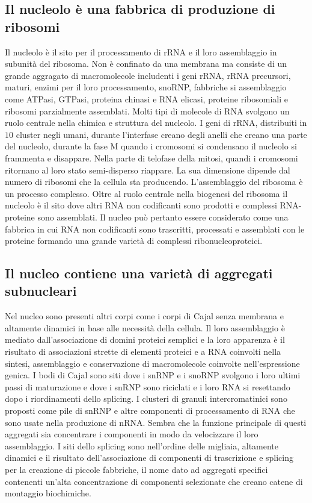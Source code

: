 \subsection{Il nucleolo \`e una fabbrica di produzione di ribosomi}
Il nucleolo \`e il sito per il processamento di rRNA e il loro assemblaggio in subunit\`a del ribosoma. Non \`e confinato da una membrana ma consiste di un grande aggragato di 
macromolecole includenti i geni rRNA, rRNA precursori, maturi, enzimi per il loro processamento, snoRNP, fabbriche si assemblaggio come ATPasi, GTPasi, proteina chinasi e RNA elicasi, 
proteine ribosomiali e ribosomi parzialmente assemblati. Molti tipi di molecole di RNA svolgono un ruolo centrale nella chimica e struttura del nucleolo. I geni di rRNA, distribuiti in
$10$ cluster negli umani, durante l'interfase creano degli anelli che creano una parte del nucleolo, durante la fase M quando i cromosomi si condensano il nucleolo si frammenta e 
disappare. Nella parte di telofase della mitosi, quandi i cromosomi ritornano al loro stato semi-disperso riappare. La sua dimensione dipende dal numero di ribosomi che la cellula sta
producendo. L'assemblaggio del ribosoma \`e un processo complesso. Oltre al ruolo centrale nella biogenesi del ribosoma il nucleolo \`e il sito dove altri RNA non codificanti sono
prodotti e complessi RNA-proteine sono assemblati. Il nucleo pu\`o pertanto essere considerato come una fabbrica in cui RNA non codificanti sono trascritti, processati e assemblati con
le proteine formando una grande variet\`a di complessi ribonucleoproteici. 
\subsection{Il nucleo contiene una variet\`a di aggregati subnucleari}
Nel nucleo sono presenti altri corpi come i corpi di Cajal senza membrana e altamente dinamici in base alle necessit\`a della cellula. Il loro assemblaggio \`e mediato dall'associazione
di domini proteici semplici e la loro apparenza \`e il risultato di associazioni strette di elementi proteici e a RNA coinvolti nella sintesi, assemblaggio e conservazione di 
macromolecole coinvolte nell'espressione genica. I bodi di Cajal sono siti dove i snRNP e i snoRNP svolgono i loro ultimi passi di maturazione e dove i snRNP sono riciclati e i loro RNA
si resettando dopo i riordinamenti dello splicing. I clusteri di granuli intercromatinici sono proposti come pile di snRNP e altre componenti di processamento di RNA che sono 
usate nella produzione di nRNA. Sembra che la funzione principale di questi aggregati sia concentrare i componenti in modo da velocizzare il loro assemblaggio. I siti dello splicing
sono nell'ordine delle migliaia, altamente dinamici e il risultato dell'associazione di componenti di trascrizione e splicing per la creazione di piccole fabbriche, il nome dato ad
aggregati specifici contenenti un'alta concentrazione di componenti selezionate che creano catene di montaggio biochimiche. 
